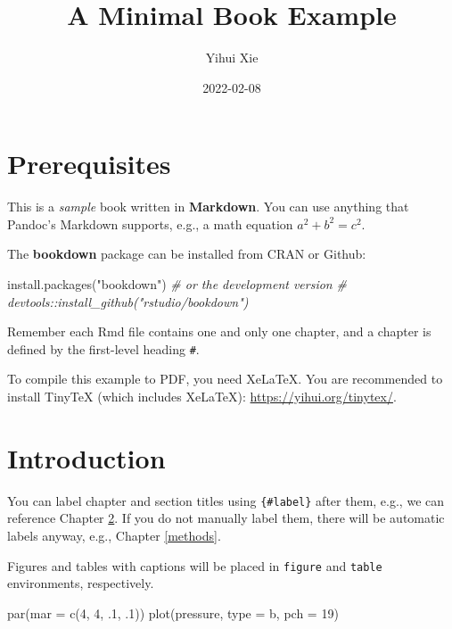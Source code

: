 \documentclass[
]{book}
\title{A Minimal Book Example}
\author{Yihui Xie}
\date{2022-02-08}
\newenvironment{Shaded}{\begin{snugshade}}{\end{snugshade}}
\newcommand{\AttributeTok}[1]{\textcolor[rgb]{0.77,0.63,0.00}{#1}}
\newcommand{\CommentTok}[1]{\textcolor[rgb]{0.56,0.35,0.01}{\textit{#1}}}
\newcommand{\DecValTok}[1]{\textcolor[rgb]{0.00,0.00,0.81}{#1}}
\newcommand{\FunctionTok}[1]{\textcolor[rgb]{0.00,0.00,0.00}{#1}}
\newcommand{\NormalTok}[1]{#1}
\newcommand{\StringTok}[1]{\textcolor[rgb]{0.31,0.60,0.02}{#1}}
\theoremstyle{definition}
\theoremstyle{definition}
\theoremstyle{definition}
\theoremstyle{definition}
\theoremstyle{remark}
\begin{document}
\maketitle

{
\setcounter{tocdepth}{1}
\tableofcontents
}
\hypertarget{prerequisites}{%
\chapter{Prerequisites}\label{prerequisites}}

This is a \emph{sample} book written in \textbf{Markdown}. You can use anything that Pandoc's Markdown supports, e.g., a math equation \(a^2 + b^2 = c^2\).

The \textbf{bookdown} package can be installed from CRAN or Github:

\begin{Shaded}
\begin{Highlighting}[]
\FunctionTok{install.packages}\NormalTok{(}\StringTok{"bookdown"}\NormalTok{)}
\CommentTok{\# or the development version}
\CommentTok{\# devtools::install\_github("rstudio/bookdown")}
\end{Highlighting}
\end{Shaded}

Remember each Rmd file contains one and only one chapter, and a chapter is defined by the first-level heading \texttt{\#}.

To compile this example to PDF, you need XeLaTeX. You are recommended to install TinyTeX (which includes XeLaTeX): \url{https://yihui.org/tinytex/}.

\hypertarget{intro}{%
\chapter{Introduction}\label{intro}}

You can label chapter and section titles using \texttt{\{\#label\}} after them, e.g., we can reference Chapter \ref{intro}. If you do not manually label them, there will be automatic labels anyway, e.g., Chapter \ref{methods}.

Figures and tables with captions will be placed in \texttt{figure} and \texttt{table} environments, respectively.

\begin{Shaded}
\begin{Highlighting}[]
\FunctionTok{par}\NormalTok{(}\AttributeTok{mar =} \FunctionTok{c}\NormalTok{(}\DecValTok{4}\NormalTok{, }\DecValTok{4}\NormalTok{, .}\DecValTok{1}\NormalTok{, .}\DecValTok{1}\NormalTok{))}
\FunctionTok{plot}\NormalTok{(pressure, }\AttributeTok{type =} \StringTok{\textquotesingle{}b\textquotesingle{}}\NormalTok{, }\AttributeTok{pch =} \DecValTok{19}\NormalTok{)}
\end{Highlighting}
\end{Shaded}
\end{document}
